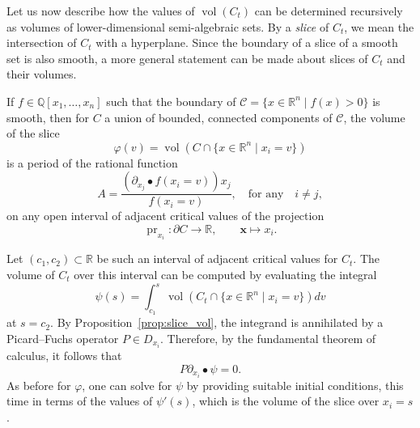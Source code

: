 \documentclass[sigconf, nonacm]{acmart} %
\DeclareMathOperator{\vol}{vol}
\newcommand{\pr}[0]{{\operatorname{pr}}}
\begin{document}
Let us now describe how the values of $\vol(C_t)$ can be determined recursively as volumes of lower-dimensional semi-algebraic sets. 
By a {\em slice} of $C_t$, we mean the intersection of $C_t$ with a hyperplane. 
Since the boundary of a slice of a smooth set is also smooth, a more general statement can be made about slices of $C_t$ and their volumes.
\begin{proposition}\label{prop:slice_vol}
    If $f \in \mathbb{Q}[x_1,\ldots,x_n]$ such that the boundary of $\mathcal C = \{x \in \mathbb R^n \mid f(x)>0\}$ is smooth, then for $C$ a union of bounded, connected components of $\mathcal C$,
    the volume of the slice 
    \begin{equation*}
        \varphi(v) = \vol(C \cap \{x \in \mathbb R^n \mid x_i=v\})
    \end{equation*}is a period of the rational function
\begin{equation}\label{eq:rational_function}
    A = \frac{(\partial_{x_j}\bullet f(x_i = v))x_j}{f(x_i = v)}, \quad \text{for any}\quad i\not = j,
\end{equation}
on any open interval of adjacent critical values of the projection
\begin{equation}\label{eq:proj}
    \pr_{x_i} : \partial C \rightarrow \mathbb{R}, \qquad \mathbf{x} \mapsto x_i.
\end{equation}
\end{proposition}

Let $(c_1,c_2) \subset \mathbb{R}$ be such an interval of adjacent critical values for $C_t$. The volume of $C_t$ over this interval can be computed by evaluating the integral
\begin{equation}
    \psi(s) = \int^{s}_{c_1}\vol(C_t \cap \{x \in \mathbb R^n \mid x_i=v\})dv
\end{equation}
at $s=c_2$. By Proposition~\ref{prop:slice_vol}, the integrand is annihilated by a Picard--Fuchs operator $P \in D_{x_i}$. Therefore, by the fundamental theorem of calculus, it follows that
\begin{equation}
    P\partial_{x_i} \bullet \psi = 0.
\end{equation} 
As before for $\varphi$, one can solve for $\psi$ by providing suitable initial conditions, this time in terms of the values of $\psi'(s)$, which is the volume of the slice over $x_i =s$. 
\end{document}
